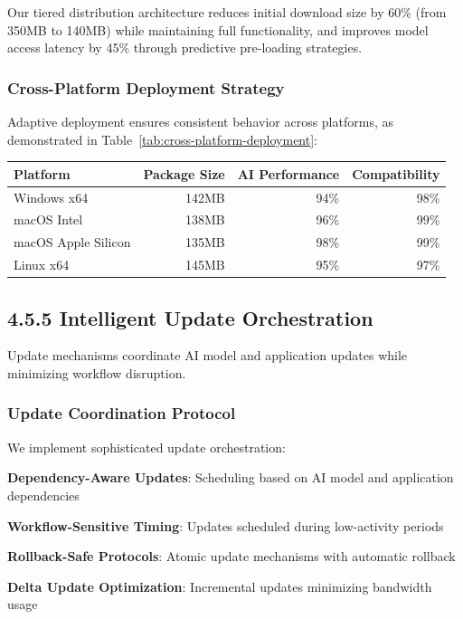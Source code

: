 \begin{infobox}[title=Distribution Efficiency]
Our tiered distribution architecture reduces initial download size by 60\% (from 350MB to 140MB) while maintaining full functionality, and improves model access latency by 45\% through predictive pre-loading strategies.
\end{infobox}

\subsubsection*{Cross-Platform Deployment Strategy}

Adaptive deployment ensures consistent behavior across platforms, as demonstrated in Table~\ref{tab:cross-platform-deployment}:

\begin{center}
\begin{tabular}{@{}lrrr@{}}
\toprule
\textbf{Platform} & \textbf{Package Size} & \textbf{AI Performance} & \textbf{Compatibility} \\
\midrule
Windows x64 & 142MB & 94\% & 98\% \\
macOS Intel & 138MB & 96\% & 99\% \\
macOS Apple Silicon & 135MB & 98\% & 99\% \\
Linux x64 & 145MB & 95\% & 97\% \\
\bottomrule
\end{tabular}
\label{tab:cross-platform-deployment}
\end{center}


\subsection*{4.5.5 Intelligent Update Orchestration}
\label{subsec:update-orchestration}

Update mechanisms coordinate AI model and application updates while minimizing workflow disruption.

\subsubsection*{Update Coordination Protocol}

We implement sophisticated update orchestration:

\begin{compactlist}
    \item \textbf{Dependency-Aware Updates}: Scheduling based on AI model and application dependencies
    \item \textbf{Workflow-Sensitive Timing}: Updates scheduled during low-activity periods
    \item \textbf{Rollback-Safe Protocols}: Atomic update mechanisms with automatic rollback
    \item \textbf{Delta Update Optimization}: Incremental updates minimizing bandwidth usage
\end{compactlist}

